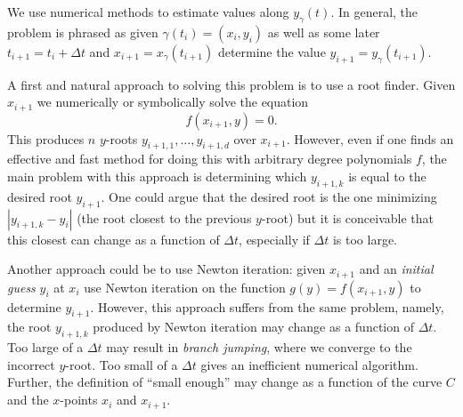 We use numerical methods to estimate values along $y_\gamma(t)$. In general, the
problem is phrased as given $\gamma(t_i) = (x_i,y_i)$ as well as some later
$t_{i+1} = t_i + \Delta t$ and $x_{i+1} = x_\gamma(t_{i+1})$ determine the value
$y_{i+1} = y_\gamma(t_{i+1})$.

A first and natural approach to solving this problem is to use a root finder.
Given $x_{i+1}$ we numerically or symbolically solve the equation
\[
  f(x_{i+1},y) = 0.
\]
This produces $n$ $y$-roots $y_{i+1,1}, \ldots, y_{i+1,d}$ over $x_{i+1}$.
However, even if one finds an effective and fast method for doing this with
arbitrary degree polynomials $f$, the main problem with this approach is
determining which $y_{i+1,k}$ is equal to the desired root $y_{i+1}$. One could
argue that the desired root is the one minimizing $|y_{i+1,k} - y_i|$ (the root
closest to the previous $y$-root) but it is conceivable that this closest can
change as a function of $\Delta t$, especially if $\Delta t$ is too large.

Another approach could be to use Newton iteration: given $x_{i+1}$ and an {\it
  initial guess} $y_i$ at $x_i$ use Newton iteration on the function $g(y) =
f(x_{i+1}, y)$ to determine $y_{i+1}$. However, this approach suffers from the
same problem, namely, the root $y_{i+1,k}$ produced by Newton iteration may
change as a function of $\Delta t$. Too large of a $\Delta t$ may result in {\it
  branch jumping}, where we converge to the incorrect $y$-root. Too small of a
$\Delta t$ gives an inefficient numerical algorithm. Further, the definition of
``small enough'' may change as a function of the curve $C$ and the $x$-points
$x_{i}$ and $x_{i+1}$.

